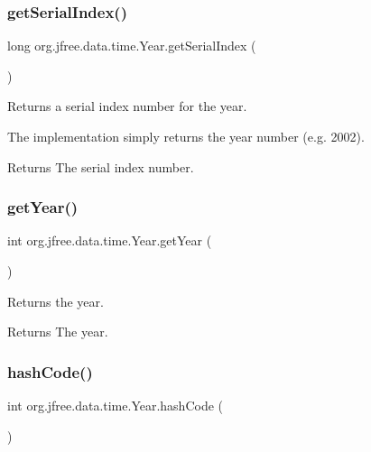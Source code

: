 \subsubsection{\texorpdfstring{get\+Serial\+Index()}{getSerialIndex()}}
{\footnotesize\ttfamily long org.\+jfree.\+data.\+time.\+Year.\+get\+Serial\+Index (\begin{DoxyParamCaption}{ }\end{DoxyParamCaption})}

Returns a serial index number for the year. 

The implementation simply returns the year number (e.\+g. 2002).

\begin{DoxyReturn}{Returns}
The serial index number. 
\end{DoxyReturn}
\mbox{\label{classorg_1_1jfree_1_1data_1_1time_1_1_year_ab6da2d250464461b6d9c83743ee07539}} 
\subsubsection{\texorpdfstring{get\+Year()}{getYear()}}
{\footnotesize\ttfamily int org.\+jfree.\+data.\+time.\+Year.\+get\+Year (\begin{DoxyParamCaption}{ }\end{DoxyParamCaption})}

Returns the year.

\begin{DoxyReturn}{Returns}
The year. 
\end{DoxyReturn}
\mbox{\label{classorg_1_1jfree_1_1data_1_1time_1_1_year_a375116a62ffd54b37f6fb17d35e552ea}} 
\subsubsection{\texorpdfstring{hash\+Code()}{hashCode()}}
{\footnotesize\ttfamily int org.\+jfree.\+data.\+time.\+Year.\+hash\+Code (\begin{DoxyParamCaption}{ }\end{DoxyParamCaption})}

